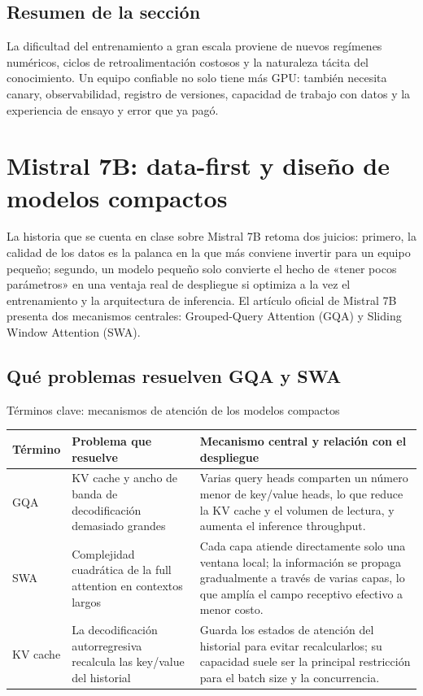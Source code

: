 \documentclass[a4paper]{article}
\begin{document}
\subsection{Resumen de la sección}

La dificultad del entrenamiento a gran escala proviene de nuevos regímenes numéricos, ciclos de retroalimentación costosos y la naturaleza tácita del conocimiento. Un equipo confiable no solo tiene más GPU: también necesita canary, observabilidad, registro de versiones, capacidad de trabajo con datos y la experiencia de ensayo y error que ya pagó.
\section{Mistral 7B: data-first y diseño de modelos compactos}

La historia que se cuenta en clase sobre Mistral 7B retoma dos juicios: primero, la calidad de los datos es la palanca en la que más conviene invertir para un equipo pequeño; segundo, un modelo pequeño solo convierte el hecho de «tener pocos parámetros» en una ventaja real de despliegue si optimiza a la vez el entrenamiento y la arquitectura de inferencia. El artículo oficial de Mistral 7B presenta dos mecanismos centrales: Grouped-Query Attention (GQA) y Sliding Window Attention (SWA).

\subsection{Qué problemas resuelven GQA y SWA}

\begin{knowledgebox}{Términos clave: mecanismos de atención de los modelos compactos}
\begin{tabularx}{\textwidth}{L{0.18\textwidth}>{\raggedright\arraybackslash}X>{\raggedright\arraybackslash}X}
\toprule
Término & Problema que resuelve & Mecanismo central y relación con el despliegue \\
\midrule
GQA & KV cache y ancho de banda de decodificación demasiado grandes & Varias query heads comparten un número menor de key/value heads, lo que reduce la KV cache y el volumen de lectura, y aumenta el inference throughput. \\
SWA & Complejidad cuadrática de la full attention en contextos largos & Cada capa atiende directamente solo una ventana local; la información se propaga gradualmente a través de varias capas, lo que amplía el campo receptivo efectivo a menor costo. \\
KV cache & La decodificación autorregresiva recalcula las key/value del historial & Guarda los estados de atención del historial para evitar recalcularlos; su capacidad suele ser la principal restricción para el batch size y la concurrencia. \\
\bottomrule
\end{tabularx}
\end{knowledgebox}
\end{document}
